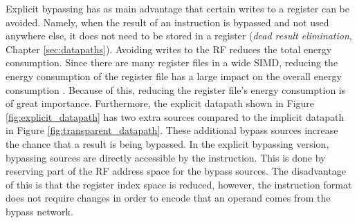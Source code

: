 

Explicit bypassing has as main advantage that certain writes to a register can be avoided. Namely, when the result of an instruction is bypassed and not used anywhere else, it does not need to be stored in a register (\emph{dead result elimination}, Chapter \ref{sec:datapaths}). Avoiding writes to the RF reduces the total energy consumption. Since there are many register files in a wide SIMD, reducing the energy consumption of the register file has a large impact on the overall energy consumption \cite{dongrio1}. Because of this, reducing the register file's energy consumption is of great importance. Furthermore, the explicit datapath shown in Figure \ref{fig:explicit_datapath} has two extra sources compared to the implicit datapath in Figure \ref{fig:transparent_datapath}. These additional bypass sources increase the chance that a result is being bypassed. In the explicit bypassing version, bypassing sources are directly accessible by the instruction. This is done by reserving part of the RF address space for the bypass sources. The disadvantage of this is that the register index space is reduced, however, the instruction format does not require changes in order to encode that an operand comes from the bypass network.%

